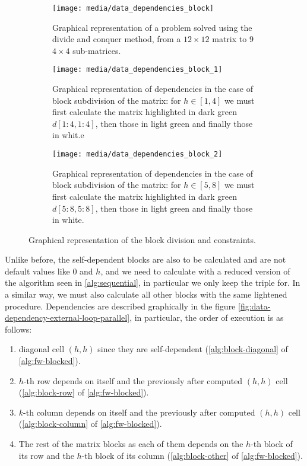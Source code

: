 \begin{figure}[htbp]
    \centering
    \begin{subfigure}[t]{0.3\textwidth}
        \texttt{[image: media/data\_dependencies\_block]}
        \caption{Graphical representation of a problem solved using the divide and conquer method, from a \(12\times 12\) matrix to \(9\) \(4\times 4\) sub-matrices.}
        \label{fig:submatrix}
    \end{subfigure}
    \hfill
    \begin{subfigure}[t]{0.3\textwidth}
        \texttt{[image: media/data\_dependencies\_block\_1]}
        \caption{Graphical representation of dependencies in the case of block subdivision of the matrix: for \(h \in [1,4]\) we must first calculate the matrix highlighted in dark green \(d[1:4,1:4]\), then those in light green and finally those in whit.e}
        \label{fig:data-dependencies-block-1}
    \end{subfigure}
    \hfill
    \begin{subfigure}[t]{0.3\textwidth}
        \texttt{[image: media/data\_dependencies\_block\_2]}
        \caption{Graphical representation of dependencies in the case of block subdivision of the matrix: for \(h \in [5,8]\) we must first calculate the matrix highlighted in dark green \(d[5:8,5:8]\), then those in light green and finally those in white.}
        \label{fig:data-dependencies-block-2}
    \end{subfigure}
    \caption{Graphical representation of the block division and constraints.}
    \label{fig:data-representation-of-the-block-division-and-constraints}
\end{figure}
Unlike before, the self-dependent blocks are also to be calculated and are not default values like \(0\) and \(h\), and we need to calculate with a reduced version of the algorithm seen in \cref{alg:sequential}, in particular we only keep the triple for. In a similar way, we must also calculate all other blocks with the same lightened procedure. Dependencies are described graphically in the figure \cref{fig:data-dependency-external-loop-parallel}, in particular, the order of execution is as follows:
\begin{enumerate}
    \item diagonal cell \((h,h)\) since they are self-dependent (\cref{alg:block-diagonal} of \cref{alg:fw-blocked}).
    \item \(h\)-th row depends on itself and the previously after computed  \((h,h)\) cell (\cref{alg:block-row}  of \cref{alg:fw-blocked}).
    \item \(k\)-th column depends on itself and the previously after computed  \((h,h)\) cell (\cref{alg:block-column}  of \cref{alg:fw-blocked}).
    \item The rest of the matrix blocks as each of them depends on the \(h\)-th block of its row and the \(h\)-th block of its column (\cref{alg:block-other}  of \cref{alg:fw-blocked}).
\end{enumerate}


